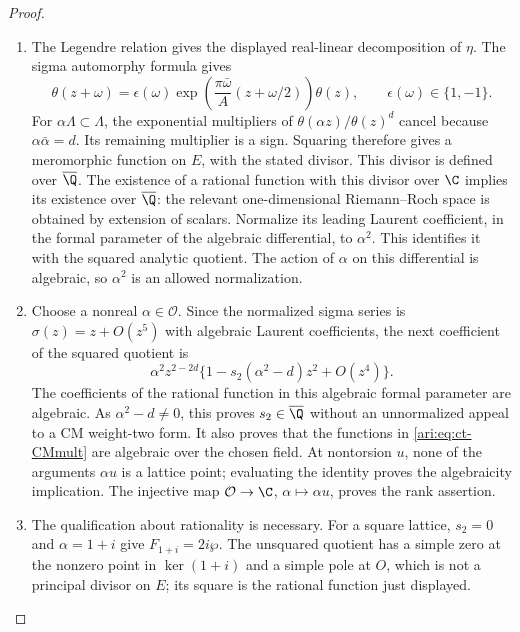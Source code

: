 \begin{proof}
\begin{enumerate}[label=\arabic*.,leftmargin=*]
\item The Legendre relation gives the displayed real-linear decomposition
of $\eta$. The sigma automorphy formula gives
\[
 \theta(z+\omega)=\epsilon(\omega)
  \exp\left(\frac{\pi\bar\omega}{A}
                         (z+\omega/2)\right)\theta(z),
 \qquad \epsilon(\omega)\in\{1,-1\}.
\]
For $\alpha\Lambda\subset\Lambda$, the exponential multipliers
of $\theta(\alpha z)/\theta(z)^d$ cancel because
$\alpha\bar\alpha=d$. Its remaining multiplier is a sign.
Squaring therefore gives a meromorphic function on $E$, with the
stated divisor. This divisor is defined over $\overline{\Q}$.
The existence of a rational function with this divisor over $\C$
implies its existence over $\overline{\Q}$: the relevant
one-dimensional Riemann--Roch space is obtained by extension of
scalars. Normalize its leading Laurent coefficient, in the formal
parameter of the algebraic differential, to $\alpha^2$. This
identifies it with the squared analytic quotient. The action of
$\alpha$ on this differential is algebraic, so $\alpha^2$ is an
allowed normalization.

\item Choose a nonreal $\alpha\in\mathcal O$. Since the normalized
sigma series is $\sigma(z)=z+O(z^5)$ with algebraic Laurent
coefficients, the next coefficient of the squared quotient is
\[
 \alpha^2z^{2-2d}
       \{1-s_2(\alpha^2-d)z^2+O(z^4)\}.
\]
The coefficients of the rational function in this algebraic formal
parameter are algebraic. As $\alpha^2-d\ne0$, this proves
$s_2\in\overline{\Q}$ without an unnormalized appeal to a CM
weight-two form. It also proves that the functions in
\eqref{ari:eq:ct-CMmult} are algebraic over the chosen field.
At nontorsion $u$, none of the arguments $\alpha u$ is a lattice
point; evaluating the identity proves the algebraicity implication.
The injective map $\mathcal O\to\C$, $\alpha\mapsto\alpha u$,
proves the rank assertion.

\item The qualification about rationality is necessary. For a square
lattice, $s_2=0$ and $\alpha=1+i$ give
$F_{1+i}=2i\wp$. The unsquared quotient has a simple zero at
the nonzero point in $\ker(1+i)$ and a simple pole at $O$,
which is not a principal divisor on $E$; its square is the
rational function just displayed.
\end{enumerate}
\end{proof}

